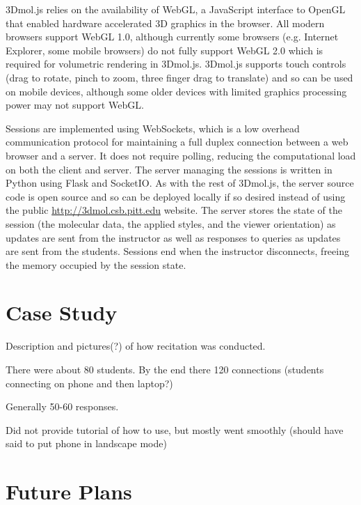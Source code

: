 \documentclass[journal=jceda8,manuscript=article]{achemso}
\begin{document}
3Dmol.js relies on the availability of WebGL, a JavaScript interface to OpenGL that enabled hardware accelerated 3D graphics in the browser.  All modern browsers support WebGL 1.0, although currently some browsers (e.g. Internet Explorer, some mobile browsers) do not fully support WebGL 2.0 which is required for volumetric rendering in 3Dmol.js.  3Dmol.js supports touch controls (drag to rotate, pinch to zoom, three finger drag to translate) and so can be used on mobile devices, although some older devices with limited graphics processing power may not support WebGL.

Sessions are implemented using WebSockets, which is a low overhead communication protocol for maintaining a full duplex connection between a web browser and a server.  It does not require polling, reducing the computational load on both the client and server. The server managing the sessions is written in Python using Flask and SocketIO.  As with the rest of 3Dmol.js, the server source code is open source and so can be deployed locally if so desired instead of using the public \url{http://3dmol.csb.pitt.edu} website. The server stores the state of the session (the molecular data, the applied styles, and the viewer orientation) as updates are sent from the instructor as well as responses to queries as updates are sent from the students.  Sessions end when the instructor disconnects, freeing the memory occupied by the session state.

\section{Case Study}


Description and pictures(?) of how recitation was conducted.

There were about 80 students.  By the end there 120 connections (students connecting on phone and then laptop?)

Generally 50-60 responses.

Did not provide tutorial of how to use, but mostly went smoothly (should have said to put phone in landscape mode)

\section{Future Plans}
\end{document}
